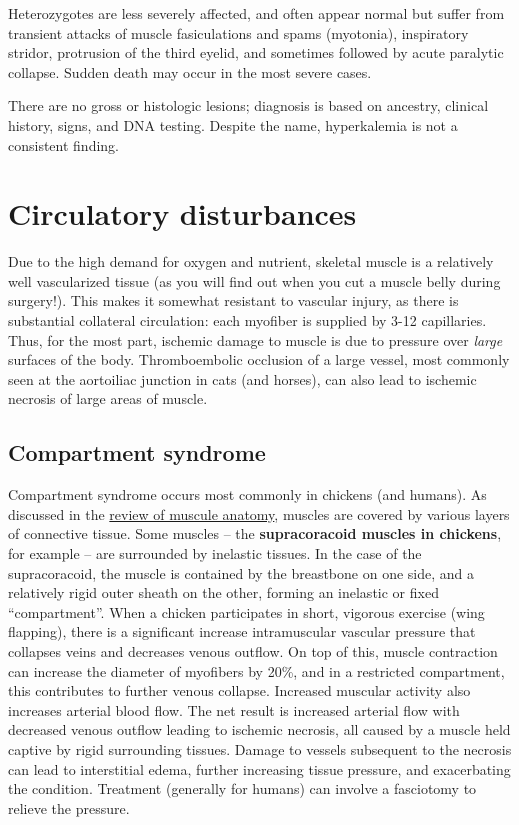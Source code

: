 \documentclass[openany]{report}
\begin{document}
Heterozygotes are less severely affected, and often appear normal but
suffer from transient attacks of muscle fasiculations and spams
(myotonia), inspiratory stridor, protrusion of the third eyelid, and
sometimes followed by acute paralytic collapse. Sudden death may occur
in the most severe cases.

There are no gross or histologic lesions; diagnosis is based on
ancestry, clinical history, signs, and DNA testing. Despite the name,
hyperkalemia is not a consistent finding.

\chapter{Circulatory disturbances}\label{circulatory-disturbances}

Due to the high demand for oxygen and nutrient, skeletal muscle is a
relatively well vascularized tissue (as you will find out when you cut a
muscle belly during surgery!). This makes it somewhat resistant to
vascular injury, as there is substantial collateral circulation: each
myofiber is supplied by 3-12 capillaries. Thus, for the most part,
ischemic damage to muscle is due to pressure over \emph{large} surfaces
of the body. Thromboembolic occlusion of a large vessel, most commonly
seen at the aortoiliac junction in cats (and horses), can also lead to
ischemic necrosis of large areas of muscle.

\section{Compartment syndrome}\label{compartment-syndrome}

Compartment syndrome occurs most commonly in chickens (and humans). As
discussed in the \protect\hyperlink{the-anatomy-of-muscle}{review of
muscule anatomy}, muscles are covered by various layers of connective
tissue. Some muscles -- the \textbf{supracoracoid muscles in chickens},
for example -- are surrounded by inelastic tissues. In the case of the
supracoracoid, the muscle is contained by the breastbone on one side,
and a relatively rigid outer sheath on the other, forming an inelastic
or fixed ``compartment''. When a chicken participates in short, vigorous
exercise (wing flapping), there is a significant increase intramuscular
vascular pressure that collapses veins and decreases venous outflow. On
top of this, muscle contraction can increase the diameter of myofibers
by 20\%, and in a restricted compartment, this contributes to further
venous collapse. Increased muscular activity also increases arterial
blood flow. The net result is increased arterial flow with decreased
venous outflow leading to ischemic necrosis, all caused by a muscle held
captive by rigid surrounding tissues. Damage to vessels subsequent to
the necrosis can lead to interstitial edema, further increasing tissue
pressure, and exacerbating the condition. Treatment (generally for
humans) can involve a fasciotomy to relieve the pressure.
\end{document}
